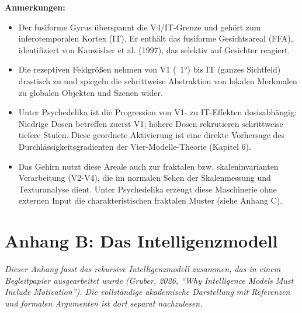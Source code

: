 \documentclass[11pt, twoside, openright]{book}
\begin{document}
\textbf{Anmerkungen:}
\begin{itemize}
  \item Der fusiforme Gyrus überspannt die V4/IT-Grenze und gehört zum inferotemporalen Kortex (IT). Er enthält das fusiforme Gesichtsareal (FFA), identifiziert von Kanwisher et al. (1997), das selektiv auf Gesichter reagiert.
  \item Die rezeptiven Feldgrößen nehmen von V1 (~1°) bis IT (ganzes Sichtfeld) drastisch zu und spiegeln die schrittweise Abstraktion von lokalen Merkmalen zu globalen Objekten und Szenen wider.
  \item Unter Psychedelika ist die Progression von V1- zu IT-Effekten dosisabhängig: Niedrige Dosen betreffen zuerst V1; höhere Dosen rekrutieren schrittweise tiefere Stufen. Diese geordnete Aktivierung ist eine direkte Vorhersage des Durchlässigkeitsgradienten der Vier-Modelle-Theorie (Kapitel 6).
  \item Das Gehirn nutzt diese Areale auch zur fraktalen bzw. skaleninvarianten Verarbeitung (V2-V4), die im normalen Sehen der Skalenmessung und Texturanalyse dient. Unter Psychedelika erzeugt diese Maschinerie ohne externen Input die charakteristischen fraktalen Muster (siehe Anhang C).
\end{itemize}

\chapter*{Anhang B: Das Intelligenzmodell}

\textit{Dieser Anhang fasst das rekursive Intelligenzmodell zusammen, das in einem Begleitpapier ausgearbeitet wurde (Gruber, 2026, ``Why Intelligence Models Must Include Motivation''). Die vollständige akademische Darstellung mit Referenzen und formalen Argumenten ist dort separat nachzulesen.}
\end{document}
